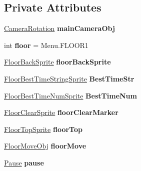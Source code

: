 \subsection*{Private Attributes}
\begin{DoxyCompactItemize}
\item 
\mbox{\label{class_stage_select_a2ed6e3bba389d42d6442097a6a6dcfc2}} 
\hyperlink{class_camera_rotation}{Camera\+Rotation} {\bfseries main\+Camera\+Obj}
\item 
\mbox{\label{class_stage_select_ab3b98c58051466baa1d28475460a8fe6}} 
int {\bfseries floor} = Menu.\+F\+L\+O\+O\+R1
\item 
\mbox{\label{class_stage_select_aea7e2a9a19ccd46afef002222935ab6b}} 
\hyperlink{class_floor_back_sprite}{Floor\+Back\+Sprite} {\bfseries floor\+Back\+Sprite}
\item 
\mbox{\label{class_stage_select_a31a473f2ef00d55caf56f9a01b33706d}} 
\hyperlink{class_floor_best_time_string_sprite}{Floor\+Best\+Time\+String\+Sprite} {\bfseries Best\+Time\+Str}
\item 
\mbox{\label{class_stage_select_ab4636e16569cde72a4bacb4a8e91f4fe}} 
\hyperlink{class_floor_best_time_num_sprite}{Floor\+Best\+Time\+Num\+Sprite} {\bfseries Best\+Time\+Num}
\item 
\mbox{\label{class_stage_select_a214b28c16b1ca415dfc21edf551f9d6f}} 
\hyperlink{class_floor_clear_sprite}{Floor\+Clear\+Sprite} {\bfseries floor\+Clear\+Marker}
\item 
\mbox{\label{class_stage_select_addabe832384dc4371321457a40c89644}} 
\hyperlink{class_floor_top_sprite}{Floor\+Top\+Sprite} {\bfseries floor\+Top}
\item 
\mbox{\label{class_stage_select_a9e1f1d2dc8d30338fa1f3ac393df0622}} 
\hyperlink{class_floor_move_obj}{Floor\+Move\+Obj} {\bfseries floor\+Move}
\item 
\mbox{\label{class_stage_select_a93ce063fc3b2c7fd07186ddb68c3dbe8}} 
\hyperlink{class_pause}{Pause} {\bfseries pause}

\end{DoxyCompactItemize}
